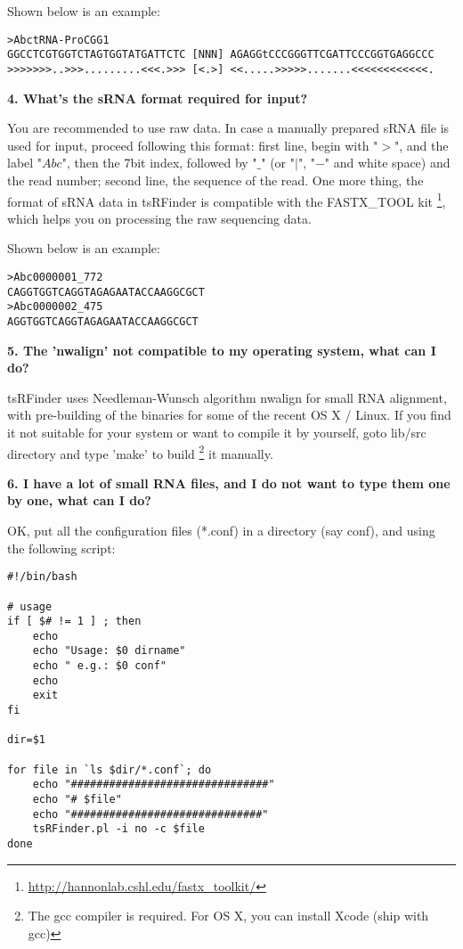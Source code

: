 \documentclass[11pt, a4paper]{article}
\begin{document}
Shown below is an example:

{\scriptsize \begin{tcolorbox}[colback=blue!5!white,colframe=pink!75!black,title=tRNA example]
\begin{verbatim}
>AbctRNA-ProCGG1
GGCCTCGTGGTCTAGTGGTATGATTCTC [NNN] AGAGGtCCCGGGTTCGATTCCCGGTGAGGCCC
>>>>>>>..>>>.........<<<.>>> [<.>] <<.....>>>>>.......<<<<<<<<<<<<.
\end{verbatim}
\end{tcolorbox}}

\textbf{4. What's the sRNA format required for input?}

You are recommended to use raw data. In case a manually prepared sRNA file is used for input, proceed following this format: first line, begin with "$>$", and the label "$Abc$", then the 7\-bit index, followed by "$\_$" (or "$|$", "$-$" and white space) and the read number; second line, the sequence of the read. One more thing, the format of sRNA data in tsRFinder is compatible with the FASTX\_TOOL kit \footnote{\url{http://hannonlab.cshl.edu/fastx_toolkit/}}, which helps you on processing the raw sequencing data.

Shown below is an example:

{\scriptsize \begin{tcolorbox}[colback=blue!5!white,colframe=pink!75!black,title=sRNA example]
\begin{verbatim}
>Abc0000001_772
CAGGTGGTCAGGTAGAGAATACCAAGGCGCT
>Abc0000002_475
AGGTGGTCAGGTAGAGAATACCAAGGCGCT
\end{verbatim}
\end{tcolorbox}}

\textbf{5. The 'nwalign' not compatible to my operating system, what can I do?}

tsRFinder uses Needleman-Wunsch algorithm nwalign for small RNA alignment, with pre-building of the binaries for some of the recent OS X / Linux. If you find it not suitable for your system or want to compile it by yourself, goto lib/src directory and type 'make' to build \footnote{The gcc compiler is required. For OS X, you can install Xcode (ship with gcc)} it manually.

\textbf{6. I have a lot of small RNA files, and I do not want to type them one by one, what can I do?}

OK, put all the configuration files (*.conf) in a directory (say conf), and using the following script:

{\scriptsize \begin{tcolorbox}[colback=blue!5!white,colframe=pink!75!black,title=demo/tsR.serial.sh]
\begin{verbatim}
#!/bin/bash

# usage
if [ $# != 1 ] ; then
	echo
	echo "Usage: $0 dirname"
	echo " e.g.: $0 conf"
	echo
	exit
fi

dir=$1

for file in `ls $dir/*.conf`; do
	echo "###############################"
	echo "# $file"
	echo "##############################"
	tsRFinder.pl -i no -c $file
done
\end{verbatim}
\end{tcolorbox}}
\end{document}
